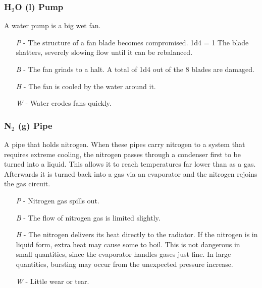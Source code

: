 \documentclass[a4paper]{article}
\begin{document}
\vspace{-0.5cm} \hspace{-18pt} \subsubsection{H$_2$O (l) Pump} \label{thermal_h2o_pump} \vspace{-0.2cm}
A water pump is a big wet fan.
\begin{enumerate}
\item [\textit{P}] - The structure of a fan blade becomes compromised. \newline \hspace*{3pt} 1d4 = 1 The blade shatters, severely slowing flow until it can be rebalanced.
\item [\textit{B}] - The fan grinds to a halt. A total of 1d4 out of the 8 blades are damaged.
\item [\textit{H}] - The fan is cooled by the water around it.
\item [\textit{W}] - Water erodes fans quickly.
\end{enumerate}

\vspace{-0.5cm} \hspace{-18pt} \subsubsection{N$_2$ (g) Pipe} \label{thermal_n2_pipe} \vspace{-0.2cm}
A pipe that holds nitrogen. When these pipes carry nitrogen to a system that requires extreme cooling, the nitrogen passes through a condenser first to be turned into a liquid. This allows it to reach temperatures far lower than as a gas. Afterwards it is turned back into a gas via an evaporator and the nitrogen rejoins the gas circuit.
\begin{enumerate}
\item [\textit{P}] - Nitrogen gas spills out.  
\item [\textit{B}] - The flow of nitrogen gas is limited slightly.
\item [\textit{H}] - The nitrogen delivers its heat directly to the radiator. If the nitrogen is in liquid form, extra heat may cause some to boil. This is not dangerous in small quantities, since the evaporator handles gases just fine. In large quantities, bursting may occur from the unexpected pressure increase.
\item [\textit{W}] - Little wear or tear.
\end{enumerate}
\end{document}
